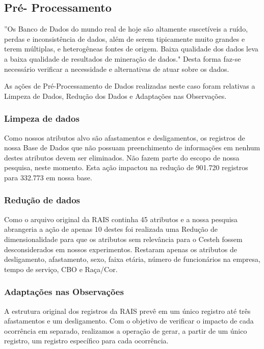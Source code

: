 \documentclass[12pt]{article}
\begin{document}
\subsection{Pré- Processamento}

''Os Banco de Dados do mundo real de hoje são altamente suscetíveis a ruído, perdas e inconsistência de dados, além de serem tipicamente muito grandes e terem múltiplas, e heterogêneas fontes de origem. Baixa qualidade dos dados leva a baixa qualidade de resultados de mineração de dados."\cite{Han2012}
Desta forma faz-se necessário verificar a necessidade e alternativas de atuar sobre os dados. 

As ações de Pré-Processamento de Dados realizadas neste caso foram relativas a Limpeza de Dados, Redução dos Dados e Adaptações nas Observações. \cite{elmasri2015fundamentals}

\subsubsection{Limpeza de dados}    

Como nossos atributos alvo são afastamentos e desligamentos, os registros de nossa Base de Dados que não possuam preenchimento de informações em nenhum destes atributos devem ser eliminados. Não fazem parte do escopo de nossa pesquisa, neste momento.
Esta ação impactou na redução de 901.720 registros para 332.773 em nossa base.

\subsubsection{Redução de dados}

Como o arquivo original da RAIS continha 45 atributos e a nossa pesquisa abrangeria a ação de apenas 10 destes foi realizada uma Redução de dimensionalidade para que os atributos sem relevância para o Cesteh fossem desconsiderados em nossos experimentos.
Restaram apenas os atributos de desligamento, afastamento, sexo, faixa etária, número de funcionários na empresa, tempo de serviço, CBO e Raça/Cor.


\subsubsection{Adaptações nas Observações}    
 
A estrutura original dos registros da RAIS prevê em um único registro até três afastamentos e um desligamento. Com o objetivo de verificar o impacto de cada ocorrência em separado, realizamos a operação de gerar, a partir de um único registro, um registro específico para cada ocorrência.
\end{document}
